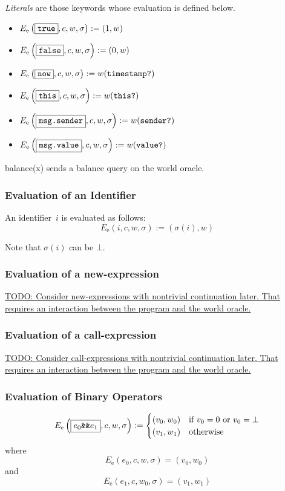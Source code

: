\documentclass{book}
\newcommand{\todo}[1]{\underline{TODO: {#1}}}
\newcommand{\evalE}[1]{E_\mathrm{e}\left({#1}\right)}
\begin{document}
\textit{Literals} are those keywords whose evaluation is defined below.

\begin{itemize}
  \item $\evalE{\boxed{\true}, c, w, \sigma} := (1, w)$
  \item $\evalE{\boxed{\false}, c, w, \sigma} := (0, w)$
  \item $\evalE{\boxed{\now}, c, w, \sigma} := w(\timestampQuery)$
  \item $\evalE{\boxed{\this}, c, w, \sigma} := w(\thisQuery)$
  \item $\evalE{\boxed{\msgsender}, c, w, \sigma} := w(\senderQuery)$
  \item $\evalE{\boxed{\msgvalue}, c, w, \sigma} := w(\valueQuery)$
\end{itemize}

balance(x) sends a balance query on the world oracle.

\subsubsection{Evaluation of an Identifier}

An identifier~$i$ is evaluated as follows:
\[
\evalE{\boxed{i}, c, w, \sigma} := (\sigma(i), w)
\]

Note that $\sigma(i)$ can be $\bot$.

\subsubsection{Evaluation of a new-expression}

\todo{Consider new-expressions with nontrivial continuation later.  That requires an interaction between the program and the world oracle. }

\subsubsection{Evaluation of a call-expression}

\todo{Consider call-expressions with nontrivial continuation later.  That requires an interaction between the program and the world oracle. }

\subsubsection{Evaluation of Binary Operators}

\[
\evalE{\boxed{\logicalAnd{e_0}{e_1}}, c, w, \sigma} :=
\begin{cases}
  (v_0, w_0) & \text{if}\ v_0 = 0\ \text{or}\ v_0 = \bot \\
  (v_1, w_1) & \text{otherwise}
\end{cases}
\]
where
\[
\evalE{\boxed{e_0}, c, w, \sigma} = (v_0, w_0)
\]
and
\[
\evalE{\boxed{e_1}, c, w_0, \sigma} = (v_1, w_1)
\]
\end{document}
